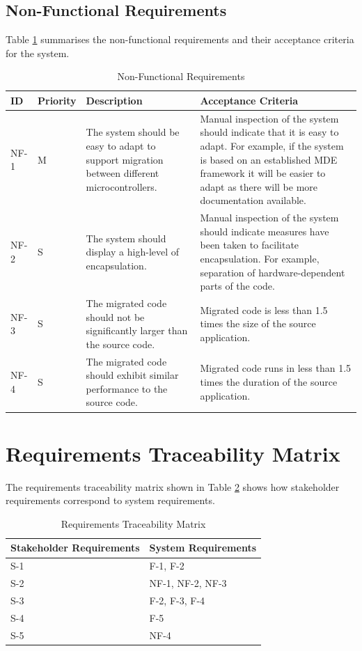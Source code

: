 \documentclass{UoYCSproject}
\newcommand{\ra}[1]{\renewcommand{\arraystretch}{#1}}
\begin{document}
\subsection{Non-Functional Requirements}
Table \ref{table:non_func_req} summarises the non-functional requirements and their acceptance criteria for the system.
\begin{table}[h!]\centering
\ra{1.3}
  \begin{tabular}{@{}p{}p{}p{}p{}@{}} \toprule 
  \textbf{ID} & \textbf{Priority} & \textbf{Description} & \textbf{Acceptance Criteria} \\
  \midrule
  NF-1 & M & The system should be easy to adapt to support migration between different microcontrollers. & Manual inspection of the system should indicate that it is easy to adapt. For example, if the system is based on an established MDE framework it will be easier to adapt as there will be more documentation available. \\
  NF-2 & S & The system should display a high-level of encapsulation.  & Manual inspection of the system should indicate measures have been taken to facilitate encapsulation. For example, separation of hardware-dependent parts of the code. \\
  NF-3 & S & The migrated code should not be significantly larger than the source code. & Migrated code is less than 1.5 times the size of the source application. \\
  NF-4 & S & The migrated code should exhibit similar performance to the source code. & Migrated code runs in less than 1.5 times the duration of the source application. \\
  
  \bottomrule
  \end{tabular}
\caption{Non-Functional Requirements}
\label{table:non_func_req}
\end{table}

\newpage
\section{Requirements Traceability Matrix}
The requirements traceability matrix shown in Table \ref{table:traceability} shows how stakeholder requirements correspond to system requirements.
\begin{table}[h!]\centering
\ra{1.3}
  \begin{tabular}{@{}p{}p{}@{}} \toprule 
  \textbf{Stakeholder Requirements} & \textbf{System Requirements} \\
  \midrule
  S-1 & F-1, F-2 \\
  S-2 & NF-1, NF-2, NF-3 \\
  S-3 & F-2, F-3, F-4 \\
  S-4 & F-5 \\
  S-5 & NF-4 \\
  \bottomrule
  \end{tabular}
\caption{Requirements Traceability Matrix}
\label{table:traceability}
\end{table}
\end{document}
